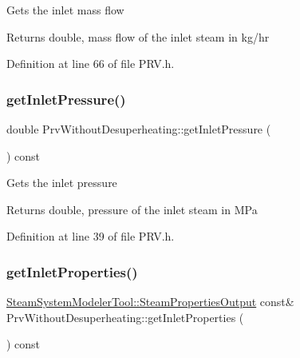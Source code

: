 Gets the inlet mass flow

\begin{DoxyReturn}{Returns}
double, mass flow of the inlet steam in kg/hr 
\end{DoxyReturn}


Definition at line 66 of file P\+R\+V.\+h.

\mbox{\label{class_prv_without_desuperheating_a4b1244b479abfaef01abbb62395dff13}} 
\subsubsection{\texorpdfstring{get\+Inlet\+Pressure()}{getInletPressure()}}
{\footnotesize\ttfamily double Prv\+Without\+Desuperheating\+::get\+Inlet\+Pressure (\begin{DoxyParamCaption}{ }\end{DoxyParamCaption}) const\hspace{0.3cm}{\ttfamily [inline]}}

Gets the inlet pressure

\begin{DoxyReturn}{Returns}
double, pressure of the inlet steam in M\+Pa 
\end{DoxyReturn}


Definition at line 39 of file P\+R\+V.\+h.

\mbox{\label{class_prv_without_desuperheating_aefb61f9d9dd99216459f6948308d11e9}} 
\subsubsection{\texorpdfstring{get\+Inlet\+Properties()}{getInletProperties()}}
{\footnotesize\ttfamily \hyperlink{struct_steam_system_modeler_tool_1_1_steam_properties_output}{Steam\+System\+Modeler\+Tool\+::\+Steam\+Properties\+Output} const\& Prv\+Without\+Desuperheating\+::get\+Inlet\+Properties (\begin{DoxyParamCaption}{ }\end{DoxyParamCaption}) const\hspace{0.3cm}{\ttfamily [inline]}}

